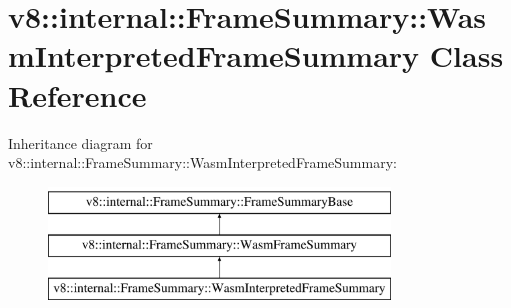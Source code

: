 \hypertarget{classv8_1_1internal_1_1FrameSummary_1_1WasmInterpretedFrameSummary}{}\section{v8\+:\+:internal\+:\+:Frame\+Summary\+:\+:Wasm\+Interpreted\+Frame\+Summary Class Reference}
\label{classv8_1_1internal_1_1FrameSummary_1_1WasmInterpretedFrameSummary}
Inheritance diagram for v8\+:\+:internal\+:\+:Frame\+Summary\+:\+:Wasm\+Interpreted\+Frame\+Summary\+:\begin{figure}[H]
\begin{center}
\leavevmode
\includegraphics[height=3.000000cm]{classv8_1_1internal_1_1FrameSummary_1_1WasmInterpretedFrameSummary}
\end{center}
\end{figure}
